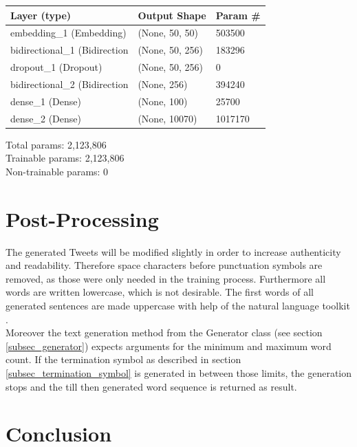 \documentclass[conference]{IEEEtran}
\begin{document}
\begin{center}
\begin{tabular}{l l l}
\hline
Layer (type) & Output Shape & Param \#\\
\hline
\hline
embedding\_1 (Embedding) & (None, 50, 50) & 503500\\
\hline
bidirectional\_1 (Bidirection & (None, 50, 256) & 183296\\
\hline
dropout\_1 (Dropout) & (None, 50, 256) & 0\\
\hline
bidirectional\_2 (Bidirection & (None, 256) & 394240\\
\hline
dense\_1 (Dense) & (None, 100) & 25700\\
\hline
dense\_2 (Dense) & (None, 10070) & 1017170\\
\hline
\hline
\end{tabular}
\begin{flushleft}
Total params: 2,123,806\\
Trainable params: 2,123,806\\
Non-trainable params: 0
\end{flushleft}
\end{center}

\section{Post-Processing}

The generated Tweets will be modified slightly in order to increase authenticity and readability. Therefore space characters before punctuation symbols are removed, as those were only needed in the training process. Furthermore all words are written lowercase, which is not desirable. The first words of all generated sentences are made uppercase with help of the natural language toolkit \cite{nltk}.\\
Moreover the text generation method from the Generator class (see section \ref{subsec_generator}) expects arguments for the minimum and maximum word count. If the termination symbol as described in section \ref{subsec_termination_symbol} is generated in between those limits, the generation stops and the till then generated word sequence is returned as result.

\section{Conclusion}
\end{document}
